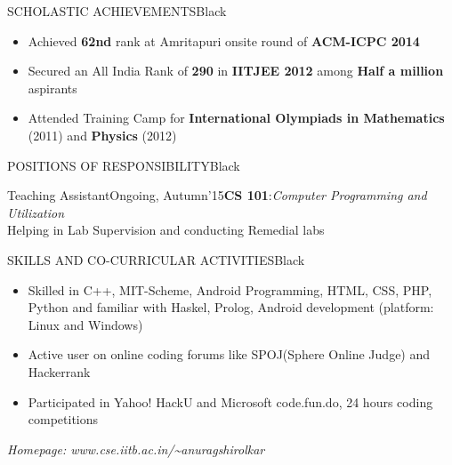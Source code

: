 \documentclass[11pt,a4paper]{article} %
\begin{document}
\begin{ressection}{SCHOLASTIC ACHIEVEMENTS}{Black}

\begin{itemize}
\itemsep-0.3em
\item Achieved \textbf{62nd} rank at Amritapuri onsite round of \textbf{ACM-ICPC 2014}
\item Secured an All India Rank of {\bf 290} in {\bf IITJEE 2012} among {\bf Half a million} aspirants
\item Attended Training Camp for \textbf{International Olympiads in Mathematics} (2011) and \textbf{Physics} (2012)
\end{itemize}

\end{ressection}



\begin{ressection}{POSITIONS OF RESPONSIBILITY}{Black}

\begin{ressubsectionold}{Teaching Assistant}{Ongoing, Autumn'15}{\textbf{CS 101}:\textit{Computer Programming and Utilization}\\ Helping in Lab Supervision and conducting Remedial labs}\\

\end{ressubsectionold}
\vspace{2mm}
\end{ressection}

\begin{ressection}{SKILLS AND CO-CURRICULAR ACTIVITIES}{Black}

\begin{itemize}
\itemsep-0.3em
\item Skilled in C++, MIT-Scheme, Android Programming, HTML, CSS, PHP, Python and familiar with Haskel, Prolog,
Android development (platform: Linux and Windows)
\item Active user on online coding forums like SPOJ(Sphere Online Judge) and Hackerrank
\item Participated in Yahoo! HackU and Microsoft code.fun.do, 24 hours coding competitions
\end{itemize}
  
\end{ressection}
\vspace{4mm}
\noindent \textit{Homepage: www.cse.iitb.ac.in/\textasciitilde anuragshirolkar}
\end{document}
